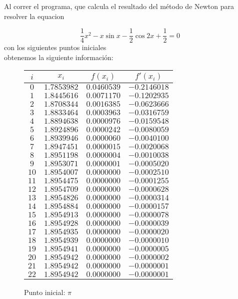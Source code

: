 
Al correr el programa, que calcula el resultado del método de Newton para resolver la equacion

\begin{equation*}
	\frac{1}{4} x^{2} - x \sin{x} - \frac{1}{2} \cos{2x} + \frac{1}{2} = 0
\end{equation*}
con los siguientes puntos iniciales 
\begin{equation*}
	[\frac{\pi}{2}, 5\pi, 10\pi]
\end{equation*}
obtenemos la siguiente información: 


\begin{figure}[H]
	\centering
	\caption{Punto inicial: $\pi$ \converge}
	\begin{tabular}{|c|c|c|c|} \hline
		$i$ & $x_{i}$ & $f(x_{i})$ & $f'(x_{i})$ \\ \hline
		$0$ & $1.7853982$ & $0.0460539$ & $-0.2146018$ \\ \hline
		$1$ & $1.8445616$ & $0.0071170$ & $-0.1202935$ \\ \hline
		$2$ & $1.8708344$ & $0.0016385$ & $-0.0623666$ \\ \hline
		$3$ & $1.8833464$ & $0.0003963$ & $-0.0316759$ \\ \hline
		$4$ & $1.8894638$ & $0.0000976$ & $-0.0159548$ \\ \hline
		$5$ & $1.8924896$ & $0.0000242$ & $-0.0080059$ \\ \hline
		$6$ & $1.8939946$ & $0.0000060$ & $-0.0040100$ \\ \hline
		$7$ & $1.8947451$ & $0.0000015$ & $-0.0020068$ \\ \hline
		$8$ & $1.8951198$ & $0.0000004$ & $-0.0010038$ \\ \hline
		$9$ & $1.8953071$ & $0.0000001$ & $-0.0005020$ \\ \hline
		$10$ & $1.8954007$ & $0.0000000$ & $-0.0002510$ \\ \hline
		$11$ & $1.8954475$ & $0.0000000$ & $-0.0001255$ \\ \hline
		$12$ & $1.8954709$ & $0.0000000$ & $-0.0000628$ \\ \hline
		$13$ & $1.8954826$ & $0.0000000$ & $-0.0000314$ \\ \hline
		$14$ & $1.8954884$ & $0.0000000$ & $-0.0000157$ \\ \hline
		$15$ & $1.8954913$ & $0.0000000$ & $-0.0000078$ \\ \hline
		$16$ & $1.8954928$ & $0.0000000$ & $-0.0000039$ \\ \hline
		$17$ & $1.8954935$ & $0.0000000$ & $-0.0000020$ \\ \hline
		$18$ & $1.8954939$ & $0.0000000$ & $-0.0000010$ \\ \hline
		$19$ & $1.8954941$ & $0.0000000$ & $-0.0000005$ \\ \hline
		$20$ & $1.8954942$ & $0.0000000$ & $-0.0000002$ \\ \hline
		$21$ & $1.8954942$ & $0.0000000$ & $-0.0000001$ \\ \hline
		$22$ & $1.8954942$ & $0.0000000$ & $-0.0000001$ \\ \hline
	\end{tabular}
\end{figure}

